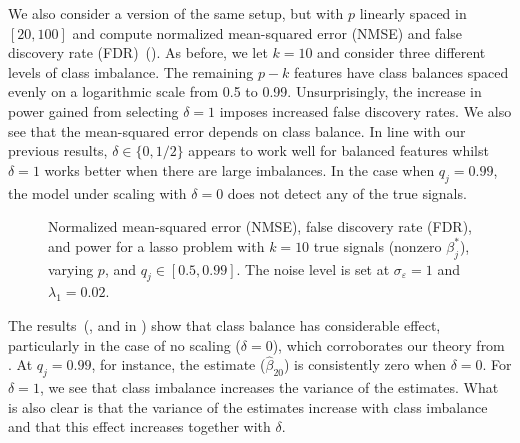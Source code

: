 We also consider a version of the same setup, but with \(p\) linearly spaced in \([20,
    100]\) and compute normalized mean-squared error (NMSE) and false discovery rate
(FDR)~(). As before, we let \(k = 10\) and consider three
different levels of class imbalance. The remaining \(p-k\) features have class balances
spaced evenly on a logarithmic scale from 0.5 to 0.99. Unsurprisingly, the increase in
power gained from selecting \(\delta = 1\) imposes increased false discovery rates. We also
see that the mean-squared error depends on class balance. In line with our previous
results, \(\delta \in \{0, 1/2\}\) appears to work well for balanced features whilst
\(\delta = 1\) works better when there are large imbalances. In the case when \(q_j =
0.99\), the model under scaling with \(\delta = 0\) does not detect any of the true
signals.

\begin{figure}[htpb]
  \centering
  \hfill%
  \caption{%
    Normalized mean-squared error (NMSE), false discovery rate (FDR), and power for a lasso problem with
    \(k = 10\) true signals (nonzero \(\beta_j^*\)), varying \(p\), and \(q_j \in [0.5, 0.99]\). The noise level is set at \(\sigma_\varepsilon = 1\) and \(\lambda_1 = 0.02\).
  }
\end{figure}

The results~(, and  in
) show that class balance has considerable effect,
particularly in the case of no scaling (\(\delta = 0\)), which corroborates our theory from
. At \(q_j=0.99\), for instance, the estimate
(\(\hat{\beta}_{20}\)) is consistently zero when \(\delta = 0\). For \(\delta=1\), we see
that class imbalance increases the variance of the estimates. What is also clear is that
the variance of the estimates increase with class imbalance and that this effect increases
together with \(\delta\).

